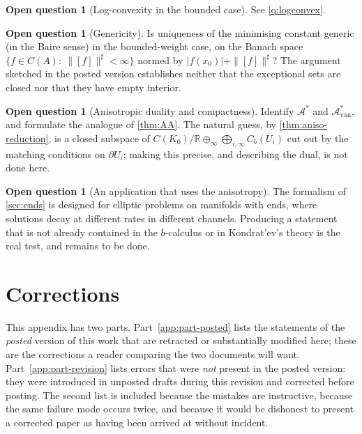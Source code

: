 \documentclass[11pt,a4paper]{article}
\numberwithin{equation}{section}
\theoremstyle{plain}
\theoremstyle{definition}
\newtheorem{question}[theorem]{Open question}
\theoremstyle{remark}
\newcommand{\R}{\mathbb{R}}
\newcommand{\Cb}{C_b}
\begin{document}
\begin{question}[Log-convexity in the bounded case]
See \cref{q:logconvex}.
\end{question}

\begin{question}[Genericity]
Is uniqueness of the minimising constant generic (in the Baire sense) in the bounded-weight
case, on the Banach space $\{f\in C(A):\ \|[f]\|^{\sharp}<\infty\}$ normed by
$|f(x_0)|+\|[f]\|^{\sharp}$? The argument sketched in the posted version establishes neither
that the exceptional sets are closed nor that they have empty interior.
\end{question}

\begin{question}[Anisotropic duality and compactness]
Identify $\mathcal{A}^{\ast}$ and $\mathcal{A}_{\mathrm{van}}^{\ast}$, and formulate the
analogue of \cref{thm:AA}. The natural guess, by \cref{thm:aniso-reduction}, is a closed
subspace of $C(K_0)/\R\oplus_{\infty}\bigoplus_{i,\infty}\Cb(U_i)$ cut out by the matching
conditions on $\partial U_i$; making this precise, and describing the dual, is not done
here.
\end{question}

\begin{question}[An application that uses the anisotropy]
The formalism of \cref{sec:ends} is designed for elliptic problems on manifolds with ends,
where solutions decay at different rates in different channels. Producing a statement that
is not already contained in the $b$-calculus \cite{Melrose1993} or in
Kondrat'ev's theory \cite{Kondratev1967} is the real test, and remains to be done.
\end{question}

\appendix

\section{Corrections}
\label{app:corrections}

This appendix has two parts. Part~\ref{app:part-posted} lists the statements of the
\emph{posted} version of this work that are retracted or substantially modified here;
these are the corrections a reader comparing the two documents will want.
Part~\ref{app:part-revision} lists errors that were \emph{not} present in the posted
version: they were introduced in unposted drafts during this revision and corrected before
posting. The second list is included because the mistakes are instructive, because the
same failure mode occurs twice, and because it would be dishonest to present a corrected
paper as having been arrived at without incident.
\end{document}
